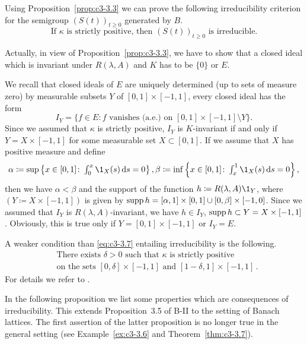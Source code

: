 \begin{examples}
\begin{enumerate}[\upshape (i), wide, labelindent=.5em]
	Using Proposition~\ref{prop:c3-3.3} we can prove the following irreducibility criterion for the semigroup $(S(t))_{t\geq 0}$ generated by $B$.
	\begin{equation}\label{eq:c3-3.7}
		\text{If } \kappa \text{ is strictly positive, then } (S(t))_{t\geq 0} \text{ is irreducible.}
	\end{equation}
	
	Actually, in view of Proposition~\ref{prop:c3-3.3}, we have to show that a closed ideal which is invariant under $R(\lambda,A)$ and $K$ has to be $\{0\}$ or $E$.
	
	We recall that closed ideals of $E$ are uniquely determined (up to sets of measure zero) by measurable subsets $Y$ of $[0,1]\times[-1,1]$, \ie  every closed ideal has the form
	\[
		I_{Y} = \{f \in E \colon f \text{ vanishes (a.e.) on } [0,1]\times[-1,1] \setminus Y\}.
	\]
	Since we assumed that $\kappa$ is strictly positive, $I_{Y}$ is $K$-invariant if and only if $Y = X\times[-1,1]$ for some measurable set $X \subset [0,1]$.
	If we assume that $X$ has positive measure and define
    \[\textstyle
	\alpha \coloneqq \sup\left\{x \in [0,1] \colon \int_{0}^{x} \1_{X}(s)\ds  = 0\right\}, \beta \coloneqq \inf\left\{x \in [0,1] \colon \int_{x}^{1} \1_{X}(s)\ds  = 0 \right\},
	\] 
	then we have $\alpha < \beta$ and the support of the function $h \coloneqq R(\lambda,A)\1_{Y}$, where 
	$(Y \coloneqq X\times[-1,1])$ is given by $\mathop{}\!\mathrm{supp}\, h = [\alpha,1]\times[0,1] \cup [0,\beta]\times[-1,0]$.
	Since we assumed that $I_{Y}$ is $R(\lambda,A)$-invariant, we have $h \in I_{Y}$, \ie  $\mathop{}\!\mathrm{supp}\, h \subset Y = X\times[-1,1]$.
	Obviously, this is true only if $Y = [0,1]\times[-1,1]$ or $I_{Y} = E$.
	
	A weaker condition than \eqref{eq:c3-3.7} entailing irreducibility is the following.
	\begin{equation}\label{eq:c3-3.8}
		\begin{aligned}
		&\text{There exists } \delta > 0 \text{ such that } \kappa \text{ is strictly positive}\\
		&\text{on the sets } [0,\delta]\times[-1,1] \text{ and } [1-\delta,1]\times[-1,1]\,.
		\end{aligned}
	\end{equation}
	For details we refer to \citet{greiner:1984d}.
	\end{enumerate}	
\end{examples}
	
In the following proposition we list some properties which are consequences of irreducibility. This extends Proposition~3.5 of B-II to the setting of Banach lattices. The first assertion of the latter proposition is no longer true in the general setting (see Example~\ref{ex:c3-3.6} and Theorem~\ref{thm:c3-3.7}). 

